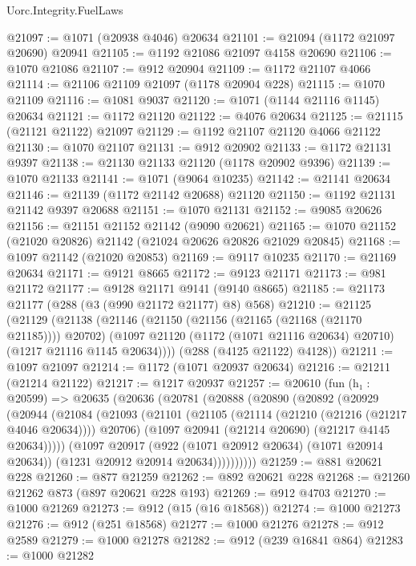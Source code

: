 \begin{lexlean}{Uorc.Integrity.FuelLaws}
\begin{coremodule}
@21097 := @1071 (@20938 @4046) @20634
@21101 := @21094 (@1172 @21097 @20690) @20941
@21105 := @1192 @21086 @21097 @4158 @20690
@21106 := @1070 @21086
@21107 := @912 @20904
@21109 := @1172 @21107 @4066
@21114 := @21106 @21109 @21097 (@1178 @20904 @228)
@21115 := @1070 @21109
@21116 := @1081 @9037
@21120 := @1071 (@1144 @21116 @1145) @20634
@21121 := @1172 @21120
@21122 := @4076 @20634
@21125 := @21115 (@21121 @21122) @21097
@21129 := @1192 @21107 @21120 @4066 @21122
@21130 := @1070 @21107
@21131 := @912 @20902
@21133 := @1172 @21131 @9397
@21138 := @21130 @21133 @21120 (@1178 @20902 @9396)
@21139 := @1070 @21133
@21141 := @1071 (@9064 @10235)
@21142 := @21141 @20634
@21146 := @21139 (@1172 @21142 @20688) @21120
@21150 := @1192 @21131 @21142 @9397 @20688
@21151 := @1070 @21131
@21152 := @9085 @20626
@21156 := @21151 @21152 @21142 (@9090 @20621)
@21165 := @1070 @21152 (@21020 @20826) @21142 (@21024 @20626 @20826 @21029 @20845)
@21168 := @1097 @21142 (@21020 @20853)
@21169 := @9117 @10235
@21170 := @21169 @20634
@21171 := @9121 @8665
@21172 := @9123 @21171
@21173 := @981 @21172
@21177 := @9128 @21171 @9141 (@9140 @8665)
@21185 := @21173 @21177 (@288 (@3 (@990 @21172 @21177) @8) @568)
@21210 := @21125
    (@21129
      (@21138
        (@21146
          (@21150 (@21156 (@21165 (@21168 (@21170 @21185)))) @20702)
          (@1097 @21120 (@1172 (@1071 @21116 @20634) @20710) (@1217 @21116 @1145 @20634))))
      (@288 (@4125 @21122) @4128))
@21211 := @1097 @21097
@21214 := @1172 (@1071 @20937 @20634)
@21216 := @21211 (@21214 @21122)
@21217 := @1217 @20937
@21257 := @20610
    (fun (h₁ : @20599) =>
    @20635
      (@20636
        (@20781
          (@20888
            (@20890
              (@20892
                (@20929
                  (@20944
                    (@21084
                      (@21093
                        (@21101
                          (@21105 (@21114 (@21210 (@21216 (@21217 @4046 @20634)))) @20706)
                          (@1097 @20941 (@21214 @20690) (@21217 @4145 @20634)))))
                    (@1097
                      @20917
                      (@922 (@1071 @20912 @20634) (@1071 @20914 @20634))
                      (@1231 @20912 @20914 @20634))))))))))
@21259 := @881 @20621 @228
@21260 := @877 @21259
@21262 := @892 @20621 @228
@21268 := @21260 @21262 @873 (@897 @20621 @228 @193)
@21269 := @912 @4703
@21270 := @1000 @21269
@21273 := @912 (@15 (@16 @18568))
@21274 := @1000 @21273
@21276 := @912 (@251 @18568)
@21277 := @1000 @21276
@21278 := @912 @2589
@21279 := @1000 @21278
@21282 := @912 (@239 @16841 @864)
@21283 := @1000 @21282

\end{coremodule}
\end{lexlean}
